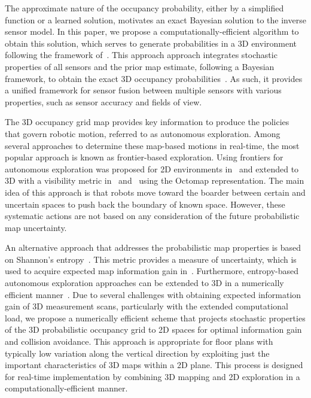 \documentclass[smallextended]{svjour3}       %
\begin{document}
The approximate nature of the occupancy probability, either by a simplified function or a learned solution, motivates an exact Bayesian solution to the inverse sensor model. In this paper, we propose a computationally-efficient algorithm to obtain this solution, which serves to generate probabilities in a 3D environment following the framework of~\cite{KauLeeAiMos16,KauTakAiLee17}. This approach approach integrates stochastic properties of all sensors and the prior map estimate, following a Bayesian framework, to obtain the exact 3D occupancy probabilities~\cite{KauTakAiLee18}. As such, it provides a unified framework for sensor fusion between multiple sensors with various properties, such as sensor accuracy and fields of view. 


The 3D occupancy grid map provides key information to produce the policies that govern robotic motion, referred to as autonomous exploration. Among several approaches to determine these map-based motions in real-time, the most popular approach is known as frontier-based exploration. Using frontiers for autonomous exploration was proposed for 2D environments in~\cite{Yam97,Yam98} and extended to 3D with a visibility metric in~\cite{SawKriSri09} and~\cite{ZhuDinLinWu15,SenWan16,KleDor13} using the Octomap representation. The main idea of this approach is that robots move toward the boarder between certain and uncertain spaces to push back the boundary of known space. However, these systematic actions are not based on any consideration of the future probabilistic map uncertainty.

An alternative approach that addresses the probabilistic map properties is based on Shannon's entropy~\cite{StaGriBur05}. This metric provides a measure of uncertainty, which is used to acquire expected map information gain in~\cite{KauAiLee16,KauTakAiLee17}. Furthermore, entropy-based autonomous exploration approaches can be extended to 3D in a numerically efficient manner~\cite{KauTakAiLee18}. Due to several challenges with obtaining expected information gain of 3D measurement scans, particularly with the extended computational load, we propose a numerically efficient scheme that projects stochastic properties of the 3D probabilistic occupancy grid to 2D spaces for optimal information gain and collision avoidance. This approach is appropriate for floor plans with typically low variation along the vertical direction by exploiting just the important characteristics of 3D maps within a 2D plane. This process is designed for real-time implementation by combining 3D mapping and 2D exploration in a computationally-efficient manner.
\end{document}

